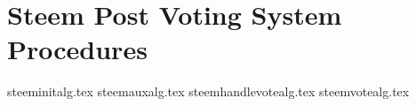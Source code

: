 \newpage
\section{Steem Post Voting System Procedures}
  \label{appendix:procs}
  {steeminitalg.tex}
  {steemauxalg.tex}
  {steemhandlevotealg.tex}
  {steemvotealg.tex}
